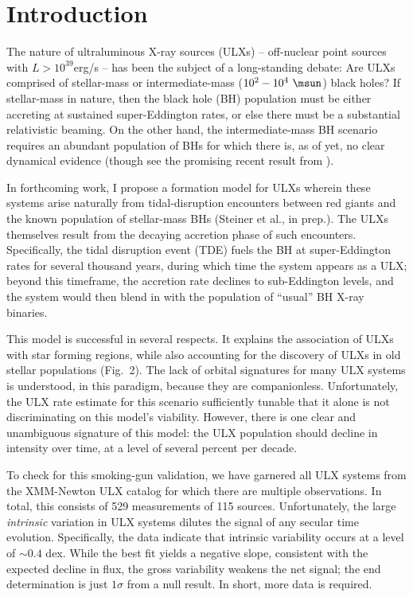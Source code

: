 \section{Introduction}\label{section:Intro}


The nature of ultraluminous X-ray sources (ULXs) -- off-nuclear point
sources with $L>10^{39}$erg/s -- has been the subject of a
long-standing debate: Are ULXs comprised of stellar-mass or
intermediate-mass ($10^{2}-10^4~\msun$) black holes?  If stellar-mass in nature, then
the black hole (BH) population must be either accreting at sustained super-Eddington
rates, or else there must be a substantial relativistic beaming.  
On the other hand, the intermediate-mass BH scenario requires an
abundant population of BHs for which there is, as of yet, no clear
dynamical evidence (though see the promising recent result from
\citealt{Pasham_2014}).

In forthcoming work, I propose a formation model for ULXs wherein
these systems arise naturally from tidal-disruption encounters between
red giants and the known population of stellar-mass BHs (Steiner et
al., in prep.).  The ULXs themselves result from the decaying
accretion phase of such encounters.  Specifically, the tidal
disruption event (TDE) fuels the BH at super-Eddington rates for
several thousand years, during which time the system appears as a ULX;
beyond this timeframe, the accretion rate declines to sub-Eddington
levels, and the system would then blend in with the population of
``usual'' BH X-ray binaries.

This model is successful in several respects. It explains the
association of ULXs with star forming regions, while also accounting
for the discovery of ULXs in old stellar populations (Fig.~2).  The
lack of orbital signatures for many ULX systems is understood, in this
paradigm, because they are companionless.  Unfortunately, the ULX rate
estimate for this scenario sufficiently tunable that it alone is not
discriminating on this model's viability.  However, there is one clear
and unambiguous signature of this model: the ULX population should
decline in intensity over time, at a level of several percent per
decade.

To check for this smoking-gun validation, we have garnered all ULX
systems from the \citet{Walton_2011} XMM-Newton ULX catalog for which
there are multiple observations.  In total, this consists of 529
measurements of 115 sources.  Unfortunately, the large {\em intrinsic}
variation in ULX systems dilutes the signal of any secular time
evolution.  Specifically, the data indicate that intrinsic variability
occurs at a level of $\sim0.4$ dex.  While the best fit yields a
negative slope, consistent with the expected decline in flux, the
gross variability weakens the net signal; the end determination is
just $1\sigma$ from a null result.  In short, more data is required.


